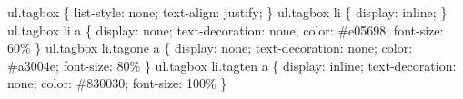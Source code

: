 \documentclass[a4paper,11pt,twoside]{scrbook}
\begin{document}
\begin{enumerate}
    ul.tagbox \{ list-style: none; text-align: justify; \}\newline
    ul.tagbox li \{ display: inline; \}\newline
    ul.tagbox li a \{ display: none; text-decoration: none; color: \#e05698; font-size: 60\% \} \newline
    ul.tagbox li.tagone a \{  display: none; text-decoration: none; color: \#a3004e; font-size: 80\% \} \newline
    ul.tagbox li.tagten a \{  display: inline; text-decoration: none; color: \#830030; font-size: 100\% \} \newline
\end{enumerate}

 
\end{document}
